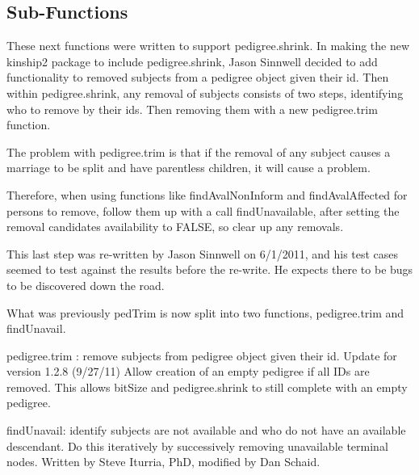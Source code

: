 \documentclass{article}
\begin{document}
  
\subsection{Sub-Functions}


These next functions were written to support pedigree.shrink.
In making the new kinship2 package to include pedigree.shrink, Jason Sinnwell
decided to add functionality to removed  subjects from a pedigree object 
given their id.  Then within pedigree.shrink, any removal of subjects consists
of two steps, identifying who to remove by their ids. Then removing them with
a new pedigree.trim function.  

The problem with pedigree.trim is that if the removal of any subject causes
a marriage to be split and have parentless children, it will cause a problem.

Therefore, when using functions like findAvalNonInform and findAvalAffected
for persons to remove, follow them up with a call findUnavailable, after 
setting the removal candidates availability to FALSE, so clear up any 
removals.

This last step was re-written by Jason Sinnwell on 6/1/2011, and his test cases
seemed to test against the results before the re-write. He expects there to 
be bugs to be discovered down the road.


What was previously pedTrim is now split into two functions, pedigree.trim and findUnavail.  

pedigree.trim : remove subjects from pedigree object given their id. 
Update for version 1.2.8 (9/27/11) Allow creation of an empty pedigree 
if all IDs are removed. This allows bitSize and 
pedigree.shrink to still complete with an empty pedigree. 

findUnavail: identify subjects are not available and who do not have 
an available descendant.  Do this iteratively by successively removing 
unavailable terminal nodes.  Written by  Steve Iturria, PhD, modified 
by Dan Schaid.

\end{document}
